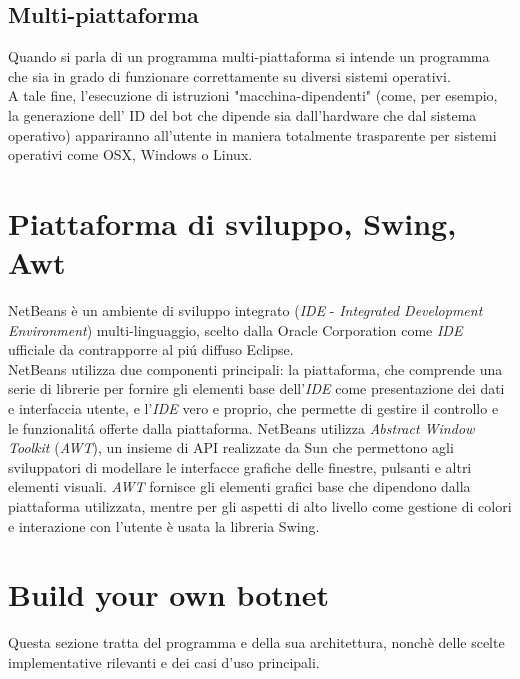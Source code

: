 \vspace*{0.5cm}
\subsection{Multi-piattaforma}
Quando si parla di un programma multi-piattaforma si intende un programma che sia in grado di funzionare correttamente su diversi sistemi operativi.\\
A tale fine, l'esecuzione di istruzioni "macchina-dipendenti" (come, per esempio, la generazione dell' ID del bot che dipende sia dall'hardware che dal sistema operativo) appariranno all'utente in maniera totalmente trasparente per sistemi operativi come OSX, Windows o Linux. 

\vspace*{0.5cm}
\section{Piattaforma di sviluppo, Swing, Awt}
NetBeans \`e un ambiente di sviluppo integrato (\textit{IDE} -  \textit{Integrated Development Environment}) multi-linguaggio, scelto dalla Oracle Corporation come \textit{IDE} ufficiale da contrapporre al pi\'u diffuso Eclipse.\\
NetBeans utilizza due componenti principali: la piattaforma, che comprende una serie di librerie per fornire gli elementi base dell'\textit{IDE} come presentazione dei dati e interfaccia utente, e l'\textit{IDE} vero e proprio, che permette di gestire il controllo e le funzionalit\'a offerte dalla piattaforma. NetBeans utilizza \textit{Abstract Window Toolkit} (\textit{AWT}), un insieme di API realizzate da Sun che permettono agli sviluppatori di modellare le interfacce grafiche delle finestre, pulsanti e altri elementi visuali. \textit{AWT} fornisce gli elementi grafici base che dipendono dalla piattaforma utilizzata, mentre per gli aspetti di alto livello come gestione di colori e interazione con l'utente \`e usata la libreria Swing.

\vspace*{1cm}
\section{Build your own botnet}
Questa sezione tratta del programma e della sua architettura, nonch\`e delle scelte implementative rilevanti e dei casi d'uso principali.

\vspace*{0.5cm}
